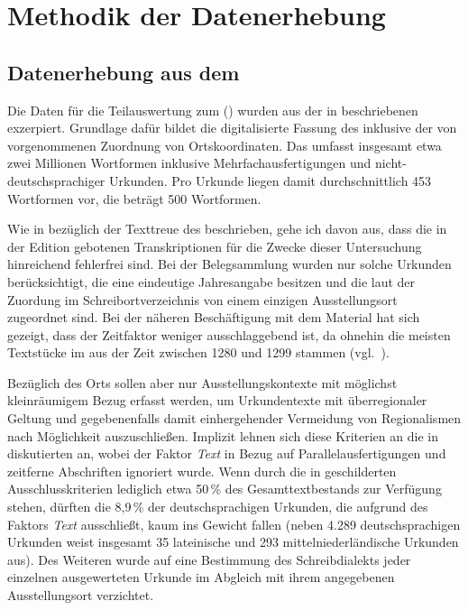 \chapter{Methodik der Datenerhebung}
\label{ch:methoden}

\section{Datenerhebung aus dem }
\label{sec:miningcao}

Die Daten für die Teilauswertung zum  (\CAO) wurden aus der in
\textcites[207]{beckerschallert2021}[155--158]{beckerschallert2022b}
beschriebenen  exzerpiert. Grundlage dafür bildet die
digitalisierte Fassung des \CAO{}
\autocites{cao-online}[vgl.~dazu][]{gniffkerapp2005} inklusive der von
\citeauthor{beckerschallert2022b} vorgenommenen Zuordnung von
Ortskoordinaten. Das \CAO{} umfasst insgesamt etwa zwei Millionen Wortformen
inklusive Mehrfachausfertigungen und nicht-deutschsprachiger
Urkunden. Pro Urkunde liegen damit durchschnittlich 453 Wortformen
vor, die  beträgt 500 Wortformen.

Wie in  bezüglich der Text\-treue des \CAO{}
beschrieben, gehe ich davon aus, dass die in der Edition gebotenen
Transkriptionen für die Zwecke dieser Untersuchung
hinreichend fehlerfrei sind. Bei der Belegsammlung wurden nur solche
Urkunden berücksichtigt, die eine eindeutige Jahresangabe besitzen
und die laut der Zuordung im Schreibortverzeichnis von \citet{cao-online} einem
einzigen Ausstellungsort zugeordnet sind. Bei der näheren Beschäftigung mit dem
Material hat sich gezeigt, dass der Zeitfaktor weniger ausschlaggebend ist, da
ohnehin die meisten Textstücke im \CAO{} aus der Zeit zwischen 1280 und 1299
stammen (vgl.~).

Bezüglich des Orts sollen aber nur
Ausstellungs\-kontexte mit möglichst kleinräumigem Bezug erfasst werden, um
Urkundentexte mit überregionaler Geltung und gegebenenfalls damit
einhergehender Vermeidung von Regionalismen nach Möglichkeit auszuschließen.
Implizit lehnen sich diese Kriterien an die in \citet[41--42]{ganslmayer2012}
diskutierten an, wobei der Faktor \emph{Text} in Bezug auf
Parallelausfertigungen und zeitferne Abschriften ignoriert
wurde. Wenn durch die in \citet[155--158]{beckerschallert2022b} geschilderten
Ausschlusskriterien lediglich etwa 50\,\% des Gesamttextbestands zur Verfügung
stehen, dürften die 8,9\,\% der deutschsprachigen Urkunden, die
\citeauthor{ganslmayer2012} aufgrund des Faktors \emph{Text} ausschließt, kaum
ins Gewicht fallen (neben 4.289 deutschsprachigen Urkunden weist
\cite[41]{ganslmayer2012} insgesamt 35 lateinische und 293
mittelniederländische Urkunden aus). Des Weiteren
wurde auf eine Bestimmung des Schreibdialekts jeder
einzelnen ausgewerteten Urkunde im Abgleich mit ihrem angegebenen
Ausstellungsort verzichtet.

